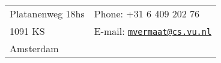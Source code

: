 \documentclass[a4paper,11pt]{article}
\begin{document}
\newlength{\oldcvlabelwidth}
\renewcommand*{\cvbibname}{}

\begin{cv}{} %



\hspace{7em}\begin{tabular}{p{12em}l}
  Platanenweg 18hs  & Phone: +31 6 409 202 76\\
  1091 KS           & E-mail: \href{mailto:mvermaat@cs.vu.nl}{\texttt{mvermaat@cs.vu.nl}}\\
  Amsterdam         &
\end{tabular}


\vspace{1em}



\end{cv}
\end{document}
